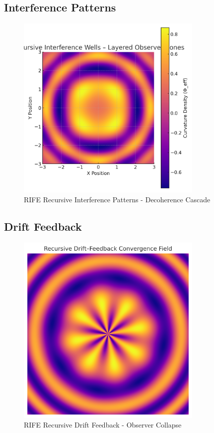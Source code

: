 \documentclass[11pt]{report}
\begin{document}
\subsection{Interference Patterns}
\begin{figure}[ht]
  \centering
  \includegraphics[width=0.8\textwidth]{recursive_engines/interference_patterns.png}
  \caption{RIFE Recursive Interference Patterns - Decoherence Cascade}
\end{figure}

\subsection{Drift Feedback}
\begin{figure}[ht]
  \centering
  \includegraphics[width=0.8\textwidth]{recursive_engines/drift_feedback.png}
  \caption{RIFE Recursive Drift Feedback - Observer Collapse}
\end{figure}
\end{document}
